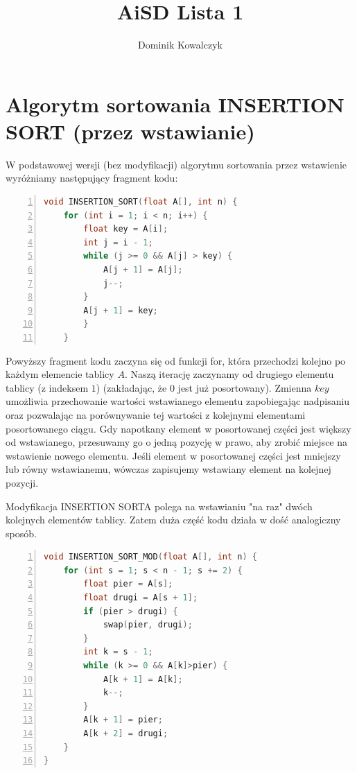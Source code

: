 \documentclass{article}
\title{AiSD Lista 1}
\author{Dominik Kowalczyk}
\begin{document}
	\maketitle  
	
	\section{Algorytm sortowania INSERTION SORT (przez wstawianie)}
	
\large {W podstawowej wersji (bez modyfikacji) algorytmu sortowania przez wstawienie wyróżniamy następujący fragment kodu: }

	\begin{lstlisting}[language=C++, caption={Kod dla funkcji sortującej przez wstawienie}, numbers=left, frame=single, xleftmargin=20pt]
void INSERTION_SORT(float A[], int n) {
	for (int i = 1; i < n; i++) {
		float key = A[i];
		int j = i - 1;
		while (j >= 0 && A[j] > key) {
			A[j + 1] = A[j];
			j--;
		}
		A[j + 1] = key;
		}
	}
	\end{lstlisting}
	
\large {Powyższy fragment kodu zaczyna się od funkcji for, która przechodzi kolejno po każdym elemencie tablicy \(A\). Naszą iterację zaczynamy od drugiego elementu tablicy (z indeksem \(1\)) (zakładając, że \(0\) jest już posortowany). Zmienna \(key\) umożliwia przechowanie wartości wstawianego elementu zapobiegając  nadpisaniu oraz pozwalając na porównywanie tej wartości z kolejnymi elementami posortowanego ciągu. Gdy napotkany element w posortowanej części jest większy od wstawianego, przesuwamy go o jedną pozycję w prawo, aby zrobić miejsce na wstawienie nowego elementu. Jeśli element w posortowanej części jest mniejszy lub równy wstawianemu, wówczas zapisujemy wstawiany element na kolejnej pozycji.}
		
\newpage

\large {Modyfikacja INSERTION SORTA polega na wstawianiu "na raz" dwóch kolejnych elementów tablicy. Zatem duża część kodu działa w dość analogiczny sposób.}



\begin{lstlisting}[language=C++, caption={Fragment 1 funkcji sortującej przez wstawienie z modyfikacją}, numbers=left, frame=single, xleftmargin=20pt, xrightmargin = 1pt]
void INSERTION_SORT_MOD(float A[], int n) {
	for (int s = 1; s < n - 1; s += 2) {
		float pier = A[s];
		float drugi = A[s + 1];
		if (pier > drugi) {
			swap(pier, drugi);
		}
		int k = s - 1;
		while (k >= 0 && A[k]>pier) {
			A[k + 1] = A[k];
			k--;
		}
		A[k + 1] = pier;
		A[k + 2] = drugi;
	}
}

\end{lstlisting}
\end{document}
